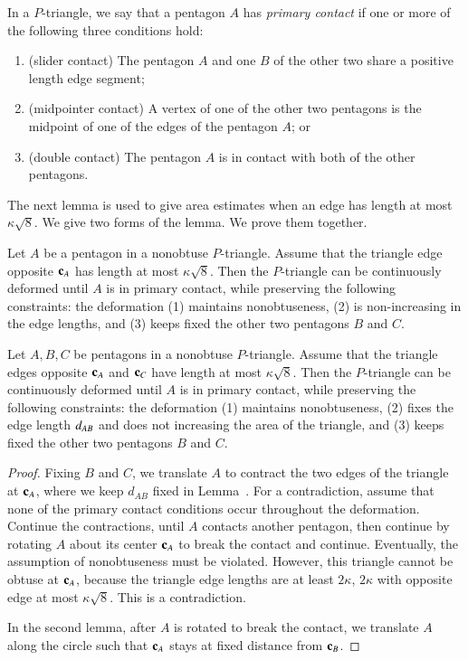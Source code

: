 \begin{definition}
In a $P$-triangle, we say that a pentagon $A$ has {\it primary
  contact} if one or more of the following three conditions hold:
\begin{enumerate}
\item (slider contact) The pentagon $A$ and one $B$ of the other two
   share a positive length edge segment;
\item (midpointer contact) A vertex of one of the other two pentagons
  is the midpoint of one of the edges of the pentagon $A$; or
\item (double contact) The pentagon $A$ is in contact with both of the
  other pentagons.
\end{enumerate}
\end{definition}

The next lemma is used to give area estimates when an edge has length
at most $\kappa\sqrt{8}$.  We give two forms of the lemma.  We prove
them together.

\begin{lemma} 
  Let $A$ be a pentagon in a nonobtuse $P$-triangle.  Assume that the
  triangle edge opposite ${\mathbf c}_A$ has length at most $\kappa\sqrt{8}$.
  Then the $P$-triangle can be continuously deformed until $A$ is in
  primary contact, while preserving the following constraints: the
  deformation (1) maintains nonobtuseness, (2) is non-increasing in
  the edge lengths, and (3) keeps fixed the other two pentagons $B$
  and $C$.
\end{lemma}

\begin{lemma} 
  Let $A,B,C$ be pentagons in a nonobtuse $P$-triangle.  Assume that
  the triangle edges opposite ${\mathbf c}_A$ and ${\mathbf c}_C$ have length at most
  $\kappa\sqrt{8}$.  Then the $P$-triangle can be continuously
  deformed until $A$ is in primary contact, while preserving the
  following constraints: the deformation (1) maintains nonobtuseness,
  (2) fixes the edge length $d_{AB}$ and does not increasing the area
  of the triangle, and (3) keeps fixed the other two pentagons $B$ and
  $C$.
\end{lemma}

\begin{proof} Fixing $B$ and $C$, we translate $A$ to contract the two
  edges of the triangle at ${\mathbf c}_A$, where we keep $d_{AB}$ fixed in
  Lemma~.  For a contradiction, assume that none
  of the primary contact conditions occur throughout the deformation.
  Continue the contractions, until $A$ contacts another pentagon, then
  continue by rotating $A$ about its center ${\mathbf c}_A$ to break the
  contact and continue.  Eventually, the assumption of nonobtuseness
  must be violated.  However, this triangle cannot be obtuse at
  ${\mathbf c}_A$, because the triangle edge lengths are at least $2 \kappa$,
  $2 \kappa$ with opposite edge at most $\kappa\sqrt{8}$. This is a
  contradiction.

  In the second lemma, after $A$ is rotated to break the contact, we
  translate $A$ along the circle such that ${\mathbf c}_A$ stays at fixed
  distance from ${\mathbf c}_B$.
\end{proof}

